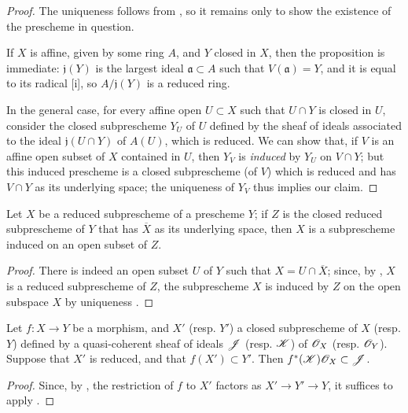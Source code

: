 \begin{proof}
\label{proof-1.5.2.1}
The uniqueness follows from , so it remains only to show the existence of the prescheme in question.

If $X$ is affine, given by some ring $A$, and $Y$ closed in $X$, then the proposition is immediate:
$\mathfrak{j}(Y)$ is the largest ideal $\mathfrak{a}\subset A$ such that $V(\mathfrak{a})=Y$, and it is equal to its radical [i], so $A/\mathfrak{j}(Y)$ is a reduced ring.

In the general case, for every affine open $U\subset X$ such that $U\cap Y$ is closed in $U$, consider the closed subprescheme $Y_U$ of $U$ defined by the sheaf of ideals associated to the ideal $\mathfrak{j}(U\cap Y)$ of $A(U)$, which is reduced.
We can show that, if $V$ is an affine open subset of $X$ contained in $U$, then $Y_V$ is \emph{induced} by $Y_U$ on $V\cap Y$;
but this induced prescheme is a closed subprescheme (of $V$) which is reduced and has $V\cap Y$ as its underlying space;
the uniqueness of $Y_V$ thus implies our claim.
\end{proof}

\begin{proposition}[5.2.2]
\label{1.5.2.2}
Let $X$ be a reduced subprescheme of a prescheme $Y$; if $Z$ is the closed reduced subprescheme of $Y$ that has $\overline{X}$ as its underlying space, then $X$ is a subprescheme induced on an open subset of $Z$.
\end{proposition}

\begin{proof}
\label{proof-1.5.2.2}
There is indeed an open subset $U$ of $Y$ such that $X=U\cap\overline{X}$;
since, by , $X$ is a reduced subprescheme of $Z$, the subprescheme $X$ is induced by $Z$ on the open subspace $X$ by uniqueness .
\end{proof}

\begin{corollary}[5.2.4]
\label{1.5.2.4}
Let $f:X\to Y$ be a morphism, and $X'$ (resp. $Y'$) a closed subprescheme of $X$ (resp. $Y$) defined by a quasi-coherent sheaf of ideals $\mathscr{J}$ (resp. $\mathscr{K}$) of $\mathscr{O}_X$ (resp. $\mathscr{O}_Y$).
Suppose that $X'$ is reduced, and that $f(X')\subset Y'$.
Then $f^*(\mathscr{K})\mathscr{O}_X\subset\mathscr{J}$.
\end{corollary}

\begin{proof}
\label{proof-1.5.2.4}
Since, by , the restriction of $f$ to $X'$ factors as $X'\to Y'\to Y$, it suffices to apply .
\end{proof}

